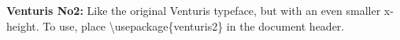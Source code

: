 \documentclass{article}
\begin{document}
\frenchspacing

\begin{description}
\item{\bf Venturis No2:}
Like the original Venturis typeface, but with an even smaller x-height. To use, place
\textbackslash usepackage\{venturis2\} in the document header.
\end{description}
\end{document}
